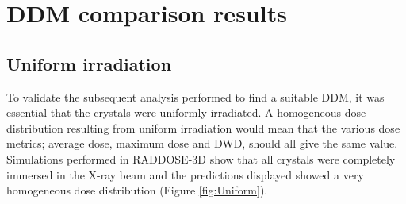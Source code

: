 \section{DDM comparison results}
\label{sec:DDM Comparison results}

\subsection{Uniform irradiation}
\label{sub:Uniform irradiation}

To validate the subsequent analysis performed to find a suitable DDM, it was essential that the crystals were uniformly irradiated.
A homogeneous dose distribution resulting from uniform irradiation would mean that the various dose metrics; average dose, maximum dose and DWD, should all give the same value.
Simulations performed in RADDOSE-3D show that all crystals were completely immersed in the X-ray beam and the predictions displayed showed a very homogeneous dose distribution (Figure \ref{fig:Uniform}).
